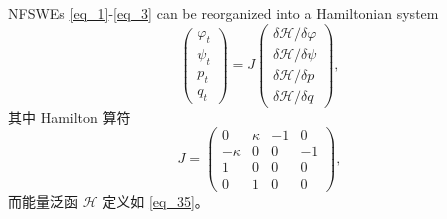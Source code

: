 \begin{theorem}\label{thm2}
	NFSWEs \eqref{eq_1}-\eqref{eq_3} can be reorganized into a Hamiltonian system
\begin{equation}\label{eq_37}
	\left(\begin{array}{l}
		\varphi_{t} \\
		\psi_{t} \\
		p_{t} \\
		q_{t}
		\end{array}\right)=J\left(\begin{array}{l}
		\delta \mathcal{H} / \delta \varphi \\
		\delta \mathcal{H} / \delta \psi \\
		\delta \mathcal{H} / \delta p \\
		\delta \mathcal{H} / \delta q
		\end{array}\right),
\end{equation}
其中 Hamilton 算符
\begin{equation}\label{eq_37b}
J=\left(\begin{array}{cccc}
		0 & \kappa & -1 & 0 \\
		-\kappa & 0 & 0 & -1 \\
		1 & 0 & 0 & 0 \\
		0 & 1 & 0 & 0
		\end{array}\right),
\end{equation}
而能量泛函 $\mathcal{H}$ 定义如 \eqref{eq_35}。
\end{theorem}

